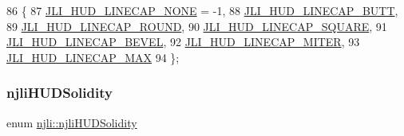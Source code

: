 \begin{DoxyCode}
86   \{
87     \mbox{\hyperlink{namespacenjli_ae73ef7aff697689e327df8c62325f30da5ef9ad168f47092744d6d57081bd0e31}{JLI\_HUD\_LINECAP\_NONE}} = -1,
88     \mbox{\hyperlink{namespacenjli_ae73ef7aff697689e327df8c62325f30dad49dbfbb891cd63ba78b52da305a3cb1}{JLI\_HUD\_LINECAP\_BUTT}},
89     \mbox{\hyperlink{namespacenjli_ae73ef7aff697689e327df8c62325f30da1e4712382b16f7b35cba94e5e7bc6350}{JLI\_HUD\_LINECAP\_ROUND}},
90     \mbox{\hyperlink{namespacenjli_ae73ef7aff697689e327df8c62325f30da1fcafdc1feeb8b65e2184c2eddd3e0a8}{JLI\_HUD\_LINECAP\_SQUARE}},
91     \mbox{\hyperlink{namespacenjli_ae73ef7aff697689e327df8c62325f30da43a1475f8a9f7f2f313c4319af6b1c9b}{JLI\_HUD\_LINECAP\_BEVEL}},
92     \mbox{\hyperlink{namespacenjli_ae73ef7aff697689e327df8c62325f30da57226e560ec12b6c1be0260f6b0413be}{JLI\_HUD\_LINECAP\_MITER}},
93     \mbox{\hyperlink{namespacenjli_ae73ef7aff697689e327df8c62325f30da8d7d7f71e1e08b9d03be703f74408cf2}{JLI\_HUD\_LINECAP\_MAX}}
94   \};
\end{DoxyCode}
\mbox{\label{namespacenjli_adcb6d335a391e792ea49e55a2b394168}} 
\subsubsection{\texorpdfstring{njli\+H\+U\+D\+Solidity}{njliHUDSolidity}}
{\footnotesize\ttfamily enum \mbox{\hyperlink{namespacenjli_adcb6d335a391e792ea49e55a2b394168}{njli\+::njli\+H\+U\+D\+Solidity}}}

